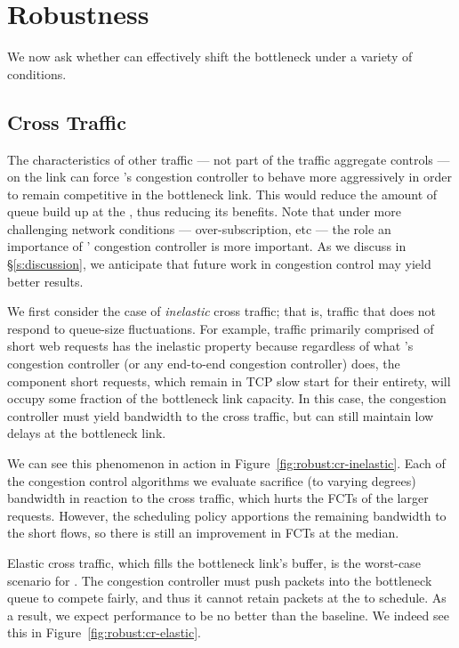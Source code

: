 \section{Robustness}\label{s:robust}

We now ask whether \name can effectively shift the bottleneck under a variety of conditions.

\subsection{Cross Traffic}\label{s:robust:cross}

The characteristics of other traffic --- not part of the traffic aggregate \name controls --- on the link can force \name's congestion controller to behave more aggressively in order to remain competitive in the bottleneck link. This would reduce the amount of queue build up at the \name, thus reducing its benefits.
Note that under more challenging network conditions --- over-subscription, etc --- the role an importance of \name' congestion controller is more important.  As we discuss in \S\ref{s:discussion}, we anticipate that future work in congestion control may yield better results.


 We first consider the case of \emph{inelastic} cross traffic; that is, traffic that does not respond to queue-size fluctuations.
For example, traffic primarily comprised of short web requests has the inelastic property because regardless of what \name's congestion controller (or any end-to-end congestion controller) does, the component short requests, which remain in TCP slow start for their entirety, will occupy some fraction of the bottleneck link capacity.
In this case, the congestion controller must yield bandwidth to the cross traffic, but can still maintain low delays at the bottleneck link.

We can see this phenomenon in action in Figure~\ref{fig:robust:cr-inelastic}. 
Each of the congestion control algorithms we evaluate sacrifice (to varying degrees) bandwidth in reaction to the cross traffic, which hurts the FCTs of the larger requests.
However, the scheduling policy apportions the remaining bandwidth to the short flows, so there is still an improvement in FCTs at the median.



 Elastic cross traffic, which fills the bottleneck link's buffer, is the worst-case scenario for \name.
The congestion controller must push packets into the bottleneck queue to compete fairly, and thus it cannot retain packets at the \inbox to schedule.
As a result, we expect performance to be no better than the baseline.
We indeed see this in Figure~\ref{fig:robust:cr-elastic}.


